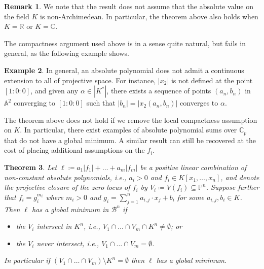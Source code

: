 \documentclass[10pt]{article}
\newtheorem{theorem}{Theorem}[]
\theoremstyle{definition}
\newtheorem{remark}[theorem]{Remark}
\newtheorem{example}[theorem]{Example}
\newcommand{\BA}{\mathbb{A}}
\newcommand{\CC}{\mathbb{C}}
\newcommand{\RR}{\mathbb{R}}
\begin{document}
\begin{remark}
  We note that the result does not assume that the absolute value on the field $K$ is non-Archimedean. In particular, the theorem above also holds when $K = \RR$ or $K = \CC$.
\end{remark}

The compactness argument used above is in a sense quite natural, but fails in general, as the following example shows.

\begin{example} \label{ex:polynomialNoExtension}
In general, an absolute polynomial does not admit a continuous extension to all of projective space. For instance, $|x_2|$ is not defined at the point $[1:0:0]$, and given any $\alpha \in |K^*|$, there exists a sequence of points $(a_n, b_n)$ in $\BA^2$ converging to $[1:0:0]$ such that $|b_n| = |x_2(a_n, b_n)|$ converges to $\alpha$.
\end{example}

The theorem above does not hold if we remove the local compactness assumption on $K$. In particular, there exist examples of absolute polynomial sums over $\CC_p$ that do not have a global minimum. A similar result can still be recovered at the cost of placing additional assumptions on the $f_i$.

\begin{theorem} \label{thm:globalMinimumAffinePower}
     Let $\ell \coloneqq a_1|f_1| + \dots + a_m|f_m|$ be a positive linear combination of non-constant absolute polynomials, i.e., $a_i > 0$ and $f_i\in K[x_1,\dots,x_n]$, and denote the projective closure of the zero locus of $f_i$ by $V_i\coloneqq V(f_i) \subseteq \mathbb{P}^n$. Suppose further that $f_i = g_i ^ {m_i}$ where $m_i>0$ and $g_i = \sum_{j=1}^na_{i,j} \cdot x_j + b_i$ for some $a_{i,j},b_i\in K$. Then $\ell$ has a global minimum in $\mathcal B^n$ if
  \begin{itemize}
    \item the $V_i$ intersect in $K^n$, i.e., $V_1 \cap \dots \cap V_m \cap K^n \neq \emptyset$; or
    \item the $V_i$ never intersect, i.e., $V_1 \cap \dots \cap V_m = \emptyset$.
  \end{itemize}
  In particular if $(V_1 \cap \dots \cap V_m) \setminus K^n = \emptyset$ then $\ell$ has a global minimum.
\end{theorem}
\end{document}
